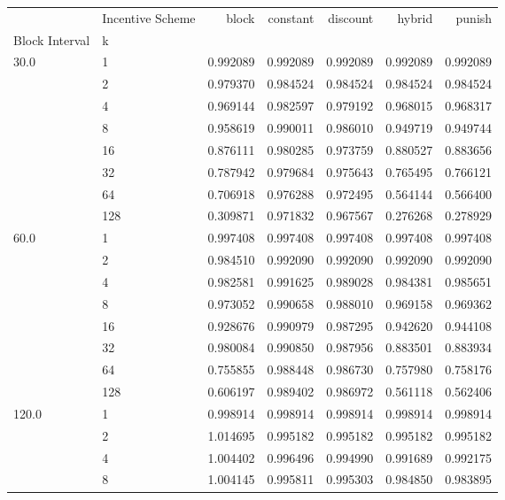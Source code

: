 \begin{tabular}{llrrrrr}
\toprule
      & Incentive Scheme &     block &  constant &  discount &    hybrid &    punish \\
Block Interval & k &           &           &           &           &           \\
\midrule
30.0  & 1   &  0.992089 &  0.992089 &  0.992089 &  0.992089 &  0.992089 \\
      & 2   &  0.979370 &  0.984524 &  0.984524 &  0.984524 &  0.984524 \\
      & 4   &  0.969144 &  0.982597 &  0.979192 &  0.968015 &  0.968317 \\
      & 8   &  0.958619 &  0.990011 &  0.986010 &  0.949719 &  0.949744 \\
      & 16  &  0.876111 &  0.980285 &  0.973759 &  0.880527 &  0.883656 \\
      & 32  &  0.787942 &  0.979684 &  0.975643 &  0.765495 &  0.766121 \\
      & 64  &  0.706918 &  0.976288 &  0.972495 &  0.564144 &  0.566400 \\
      & 128 &  0.309871 &  0.971832 &  0.967567 &  0.276268 &  0.278929 \\
60.0  & 1   &  0.997408 &  0.997408 &  0.997408 &  0.997408 &  0.997408 \\
      & 2   &  0.984510 &  0.992090 &  0.992090 &  0.992090 &  0.992090 \\
      & 4   &  0.982581 &  0.991625 &  0.989028 &  0.984381 &  0.985651 \\
      & 8   &  0.973052 &  0.990658 &  0.988010 &  0.969158 &  0.969362 \\
      & 16  &  0.928676 &  0.990979 &  0.987295 &  0.942620 &  0.944108 \\
      & 32  &  0.980084 &  0.990850 &  0.987956 &  0.883501 &  0.883934 \\
      & 64  &  0.755855 &  0.988448 &  0.986730 &  0.757980 &  0.758176 \\
      & 128 &  0.606197 &  0.989402 &  0.986972 &  0.561118 &  0.562406 \\
120.0 & 1   &  0.998914 &  0.998914 &  0.998914 &  0.998914 &  0.998914 \\
      & 2   &  1.014695 &  0.995182 &  0.995182 &  0.995182 &  0.995182 \\
      & 4   &  1.004402 &  0.996496 &  0.994990 &  0.991689 &  0.992175 \\
      & 8   &  1.004145 &  0.995811 &  0.995303 &  0.984850 &  0.983895 \\

\end{tabular}
